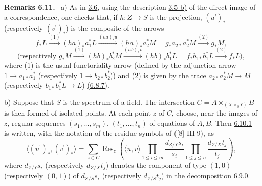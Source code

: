 \documentclass[11pt]{article}
\newenvironment{statement}[1]{\par\medskip\noindent\textbf{#1.}\ }{\par\medskip}
\begin{document}
\label{sga5:III:remark:6.11}\begin{statement}{Remarks 6.11}
a) As in \hyperref[sga5:III:subsection:3.6]{3.6}, using the description \hyperref[sga5:III:corollary:3.5]{3.5 b)} of the direct image of a correspondence, one checks that, if $h:Z\to S$ is the projection, $(u^!)_*$ (respectively $(v^!)_*$) is the composite of the arrows
\[
f_*L\xrightarrow{(1)}(ha)_*a_1^*L\xrightarrow{(ha)_*u}(ha)_*a_2^*M=g_*a_{2*}a_2^*M\xrightarrow{(2)}g_*M,
\]
\[
\text{(respectively }g_*M\xrightarrow{(1)}(hb)_*b_2^*M\xrightarrow{(hb)_*v}(hb)_*b_1^*L=f_*b_{1*}b_1^*L\xrightarrow{(2)}f_*L\text{)},
\]
where (1) is the usual functoriality arrow (defined by the adjunction arrow $1\to a_{1*}a_1^*$ (respectively $1\to b_{2*}b_2^*$)) and (2) is given by the trace $a_{2*}a_2^*M\to M$ (respectively $b_{1*}b_1^*L\to L$) \hyperref[sga5:III:equation:6.8.7]{(6.8.7)}.

b) Suppose that $S$ is the spectrum of a field. The intersection $C=A\times_{(X\times_S Y)}B$ is then formed of isolated points. At each point $z$ of $C$, choose, near the images of $z$, regular sequences $(s_1,\ldots,s_m)$, $(t_1,\ldots,t_n)$ of equations of $A,B$. Then \hyperref[sga5:III:equation:6.10.1]{6.10.1} is written, with the notation of the residue symbols of ([8] III 9), as
\begin{equation}
\tag{6.11.1}\label{sga5:III:equation:6.11.1}
\langle (u^!)_*,(v^!)_*\rangle=
\sum_{z\in C}\operatorname{Res}_z\left(\langle u,v\rangle
\prod_{1\le i\le m}\frac{d_{Z/Y}s_i}{s_i}
\prod_{1\le j\le n}\frac{d_{Z/X}t_j}{t_j}\right),
\end{equation}
where $d_{Z/Y}s_i$ (respectively $d_{Z/X}t_j$) denotes the component of type $(1,0)$ (respectively $(0,1)$) of $d_{Z/S}s_i$ (respectively $d_{Z/S}t_j$) in the decomposition \hyperref[sga5:III:equation:6.9.0]{6.9.0}.
\end{statement}
\end{document}
